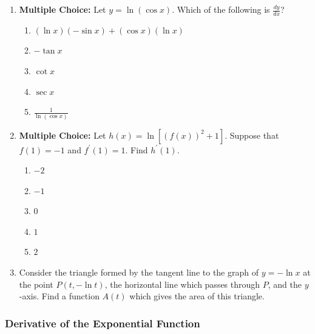 \documentclass[12pt]{article}
\newif\ifans
\begin{document}
\begin{enumerate}
\item {\bf Multiple Choice:} Let $y=\ln{(\cos{x})}$.  Which of the following is $\frac{dy}{dx}$?

\begin{enumerate}

\item $(\ln{x})(-\sin{x})+(\cos{x})(\ln{x})$

\item $-\tan{x}$

\item $\cot{x}$

\item $\sec{x}$

\item $\frac{1}{\ln{(\cos{x})}}$

\end{enumerate}

\ifans{\fbox{B}} \fi

\item {\bf Multiple Choice:} Let $h(x)=\ln[(f(x))^2+1]$.  Suppose that $f(1)=-1$ and $f^{\prime}(1)=1$.  Find $h^{\prime}(1)$.

\begin{enumerate}

\item $-2$

\item $-1$

\item $0$

\item $1$

\item $2$

\end{enumerate}

\ifans{\fbox{B}} \fi

\item Consider the triangle formed by the tangent line to the graph of $y=-\ln{x}$ at the point $P(t,-\ln{t})$, the horizontal line which passes through $P$, and the $y$-axis. Find a function $A(t)$ which gives the area of this triangle.  

\ifans{\fbox{$A(t)=\frac{1}{2}t$}} \fi

\end{enumerate}

\subsubsection*{Derivative of the Exponential Function}
\end{document}
